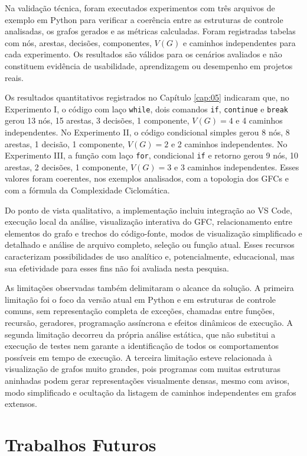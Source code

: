 Na validação técnica, foram executados experimentos com três arquivos de exemplo em Python para verificar a coerência entre as estruturas de controle analisadas, os grafos gerados e as métricas calculadas. Foram registradas tabelas com nós, arestas, decisões, componentes, \(V(G)\) e caminhos independentes para cada experimento. Os resultados são válidos para os cenários avaliados e não constituem evidência de usabilidade, aprendizagem ou desempenho em projetos reais.

Os resultados quantitativos registrados no Capítulo \ref{cap:05} indicaram que, no Experimento I, o código com laço \texttt{while}, dois comandos \texttt{if}, \texttt{continue} e \texttt{break} gerou 13 nós, 15 arestas, 3 decisões, 1 componente, \(V(G)=4\) e 4 caminhos independentes. No Experimento II, o código condicional simples gerou 8 nós, 8 arestas, 1 decisão, 1 componente, \(V(G)=2\) e 2 caminhos independentes. No Experimento III, a função com laço \texttt{for}, condicional \texttt{if} e retorno gerou 9 nós, 10 arestas, 2 decisões, 1 componente, \(V(G)=3\) e 3 caminhos independentes. Esses valores foram coerentes, nos exemplos analisados, com a topologia dos GFCs e com a fórmula da Complexidade Ciclomática.

Do ponto de vista qualitativo, a implementação incluiu integração ao VS Code, execução local da análise, visualização interativa do GFC, relacionamento entre elementos do grafo e trechos do código-fonte, modos de visualização simplificado e detalhado e análise de arquivo completo, seleção ou função atual. Esses recursos caracterizam possibilidades de uso analítico e, potencialmente, educacional, mas sua efetividade para esses fins não foi avaliada nesta pesquisa.

As limitações observadas também delimitaram o alcance da solução. A primeira limitação foi o foco da versão atual em Python e em estruturas de controle comuns, sem representação completa de exceções, chamadas entre funções, recursão, geradores, programação assíncrona e efeitos dinâmicos de execução. A segunda limitação decorreu da própria análise estática, que não substitui a execução de testes nem garante a identificação de todos os comportamentos possíveis em tempo de execução. A terceira limitação esteve relacionada à visualização de grafos muito grandes, pois programas com muitas estruturas aninhadas podem gerar representações visualmente densas, mesmo com avisos, modo simplificado e ocultação da listagem de caminhos independentes em grafos extensos.

\section{Trabalhos Futuros}

